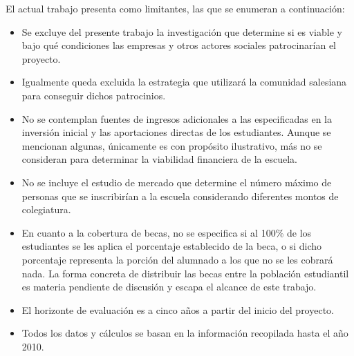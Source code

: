 El actual trabajo presenta como limitantes, las que se enumeran a continuación:

\begin{itemize}
	\item Se excluye del presente trabajo la investigación que determine si es viable y bajo qué condiciones las empresas y otros actores sociales patrocinarían el proyecto.
	\item Igualmente queda excluida la estrategia que utilizará la comunidad salesiana para conseguir dichos patrocinios.
	\item No se contemplan fuentes de ingresos adicionales a las especificadas en la inversión inicial y las aportaciones directas de los estudiantes. Aunque se mencionan algunas, únicamente es con propósito ilustrativo, más no se consideran para determinar la viabilidad financiera de la escuela.
	\item No se incluye el estudio de mercado que determine el número máximo de personas que se inscribirían a la escuela considerando diferentes montos de colegiatura. %
	\item En cuanto a la cobertura de becas, no se especifica si al 100\% de los estudiantes se les aplica el porcentaje establecido de la beca, o si dicho porcentaje representa la porción del alumnado a los que no se les cobrará nada. La forma concreta de distribuir las becas entre la población estudiantil es materia pendiente de discusión y escapa el alcance de este trabajo.
	\item El horizonte de evaluación es a cinco años a partir del inicio del proyecto. %
	\item Todos los datos y cálculos se basan en la información recopilada hasta el año 2010. %
\end{itemize}




